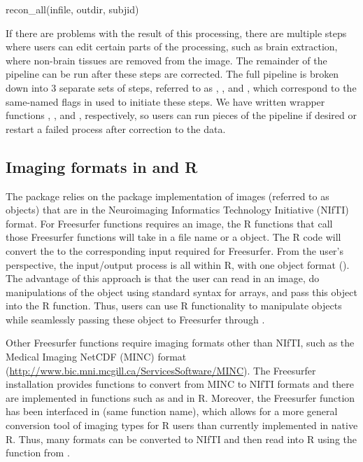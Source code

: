 \begin{Schunk}
\begin{Sinput}
recon_all(infile, outdir, subjid)
\end{Sinput}
\end{Schunk}

If there are problems with the result of this processing, there are
multiple steps where users can edit certain parts of the processing,
such as brain extraction, where non-brain tissues are removed from the
image. The remainder of the pipeline can be run after these steps are
corrected. The full pipeline is broken down into 3 separate sets of
steps, referred to as , , and
, which correspond to the same-named flags in
 used to initiate these steps. We have written wrapper
functions , , and ,
respectively, so users can run pieces of the pipeline if desired or
restart a failed process after correction to the data.

\subsection{\texorpdfstring{Imaging formats in  and
R}{Imaging formats in  and R}}\label{imaging-formats-in-and-r}

The  package relies on the 
\citep{whitcher_working_2011} package implementation of images (referred
to as  objects) that are in the Neuroimaging Informatics
Technology Initiative (NIfTI) format. For Freesurfer functions requires
an image, the R  functions that call those Freesurfer
functions will take in a file name or a  object. The R code
will convert the  to the corresponding input required for
Freesurfer. From the user's perspective, the input/output process is all
within R, with one object format (). The advantage of this
approach is that the user can read in an image, do manipulations of the
 object using standard syntax for arrays, and pass this
object into the  R function. Thus, users can use R
functionality to manipulate objects while seamlessly passing these
object to Freesurfer through .

Other Freesurfer functions require imaging formats other than NIfTI,
such as the Medical Imaging NetCDF (MINC) format
(\url{http://www.bic.mni.mcgill.ca/ServicesSoftware/MINC}). The
Freesurfer installation provides functions to convert from MINC to NIfTI
formats and there are implemented in functions such as 
and  in R. Moreover, the  Freesurfer
function has been interfaced in  (same function name),
which allows for a more general conversion tool of imaging types for R
users than currently implemented in native R. Thus, many formats can be
converted to NIfTI and then read into R using the 
function from .

